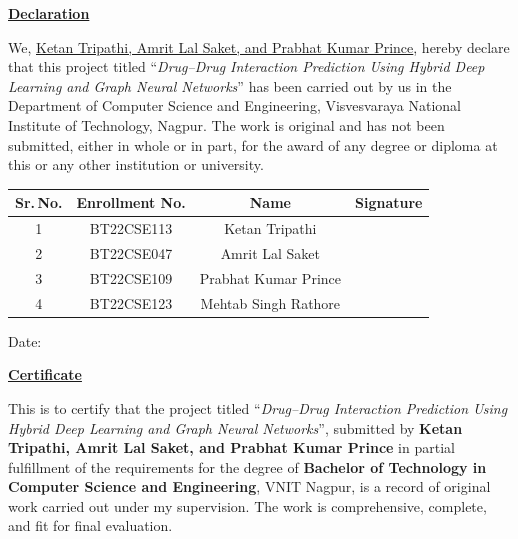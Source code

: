 \documentclass[12pt,a4paper,oneside]{report}
\begin{document}
\begin{center}
{\Large\bfseries\underline{Declaration}}
\end{center}

\vspace{0.5cm}
We, \underline{Ketan Tripathi, Amrit Lal Saket, and Prabhat Kumar Prince}, hereby declare that this project titled
``\textit{Drug--Drug Interaction Prediction Using Hybrid Deep Learning and Graph Neural
Networks}'' has been carried out by us in the Department of Computer Science and Engineering,
Visvesvaraya National Institute of Technology, Nagpur. The work is original and has not been
submitted, either in whole or in part, for the award of any degree or diploma at this or any
other institution or university.

\vspace{1cm}
\begin{flushright}
\begin{tabular}{|c|c|c|c|}
\hline
\textbf{Sr.\,No.} & \textbf{Enrollment No.} & \textbf{Name} & \textbf{Signature} \\
\hline
1 & BT22CSE113 & Ketan Tripathi & \\[1ex]
\hline
2 & BT22CSE047 & Amrit Lal Saket & \\[1ex]
\hline
3 & BT22CSE109 & Prabhat Kumar Prince & \\[1ex]
\hline
4 & BT22CSE123 & Mehtab Singh Rathore & \\[1ex]
\hline
\end{tabular}
\end{flushright}

\vspace{0.5cm}
Date: \underline{\hspace{4cm}}

\vspace{2cm}
\newpage
\thispagestyle{empty}
\begin{center}
{\Large\bfseries\underline{Certificate}}
\end{center}

\vspace{0.5cm}
This is to certify that the project titled ``\textit{Drug--Drug Interaction Prediction Using
Hybrid Deep Learning and Graph Neural Networks}'', submitted by \textbf{Ketan Tripathi, Amrit Lal Saket, and Prabhat Kumar Prince} in partial fulfillment of the requirements for the degree of \textbf{Bachelor
of Technology in Computer Science and Engineering}, VNIT Nagpur, is a record of original
work carried out under my supervision. The work is comprehensive, complete, and fit for final
evaluation.
\end{document}
